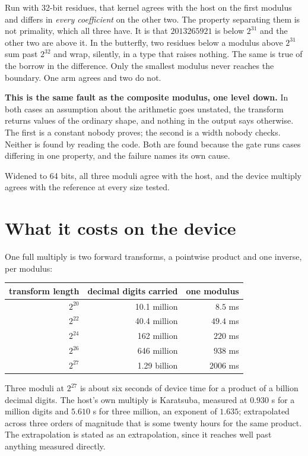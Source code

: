 Run with 32-bit residues, that kernel agrees with the host on the first modulus and differs in \emph{every coefficient} on the other two. The property separating them is not primality, which all three have. It is that \(2013265921\) is below \(2^{31}\) and the other two are above it. In the butterfly, two residues below a modulus above \(2^{31}\) sum past \(2^{32}\) and wrap, silently, in a type that raises nothing. The same is true of the borrow in the difference. Only the smallest modulus never reaches the boundary. One arm agrees and two do not.

\textbf{This is the same fault as the composite modulus, one level down.} In both cases an assumption about the arithmetic goes unstated, the transform returns values of the ordinary shape, and nothing in the output says otherwise. The first is a constant nobody proves; the second is a width nobody checks. Neither is found by reading the code. Both are found because the gate runs cases differing in one property, and the failure names its own cause.

Widened to 64 bits, all three moduli agree with the host, and the device multiply agrees with the reference at every size tested.

\section{What it costs on the device}

One full multiply is two forward transforms, a pointwise product and one inverse, per modulus:

\begin{center}
\begin{tabular}{@{}rrr@{}}
\toprule
transform length & decimal digits carried & one modulus \\
\midrule
\(2^{20}\) & 10.1 million & \(8.5\) ms \\
\(2^{22}\) & 40.4 million & \(49.4\) ms \\
\(2^{24}\) & 162 million & \(220\) ms \\
\(2^{26}\) & 646 million & \(938\) ms \\
\(2^{27}\) & 1.29 billion & \(2006\) ms \\
\bottomrule
\end{tabular}
\end{center}

Three moduli at \(2^{27}\) is about six seconds of device time for a product of a billion decimal digits. The host's own multiply is Karatsuba, measured at \(0.930\) s for a million digits and \(5.610\) s for three million, an exponent of \(1.635\); extrapolated across three orders of magnitude that is some twenty hours for the same product. The extrapolation is stated as an extrapolation, since it reaches well past anything measured directly.

